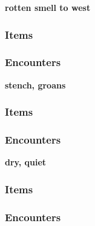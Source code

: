 \textbf{rotten smell to west}
\begin{DndReadAloud}
\end{DndReadAloud}
\subsubsection{Items}
\subsubsection{Encounters}

\textbf{stench, groans}
\begin{DndReadAloud}
\end{DndReadAloud}
\subsubsection{Items}
\subsubsection{Encounters}

\textbf{dry, quiet}
\begin{DndReadAloud}
\end{DndReadAloud}
\subsubsection{Items}
\subsubsection{Encounters}

\vfill
